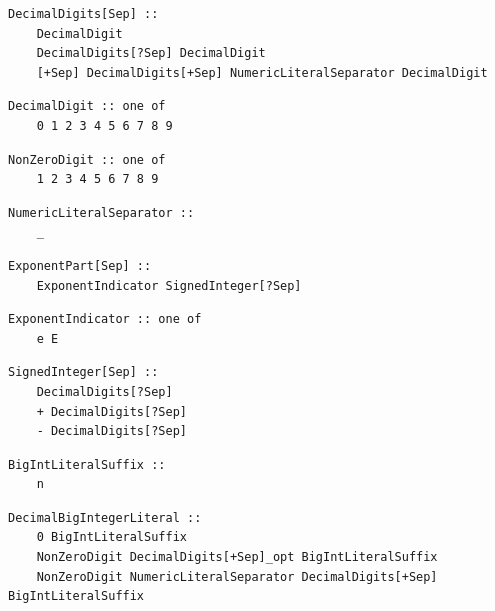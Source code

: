 \noindent\textbf{\texttt{}}\par
\begin{lstlisting}
DecimalDigits[Sep] ::
    DecimalDigit
    DecimalDigits[?Sep] DecimalDigit
    [+Sep] DecimalDigits[+Sep] NumericLiteralSeparator DecimalDigit
\end{lstlisting}

\noindent\textbf{\texttt{}}\par
\begin{lstlisting}
DecimalDigit :: one of
    0 1 2 3 4 5 6 7 8 9
\end{lstlisting}

\noindent\textbf{\texttt{}}\par
\begin{lstlisting}
NonZeroDigit :: one of
    1 2 3 4 5 6 7 8 9
\end{lstlisting}

\noindent\textbf{\texttt{}}\par
\begin{lstlisting}
NumericLiteralSeparator ::
    _
\end{lstlisting}

\noindent\textbf{\texttt{}}\par
\begin{lstlisting}
ExponentPart[Sep] ::
    ExponentIndicator SignedInteger[?Sep]
\end{lstlisting}

\noindent\textbf{\texttt{}}\par
\begin{lstlisting}
ExponentIndicator :: one of
    e E
\end{lstlisting}

\noindent\textbf{\texttt{}}\par
\begin{lstlisting}
SignedInteger[Sep] ::
    DecimalDigits[?Sep]
    + DecimalDigits[?Sep]
    - DecimalDigits[?Sep]
\end{lstlisting}

\noindent\textbf{\texttt{}}\par
\begin{lstlisting}
BigIntLiteralSuffix ::
    n
\end{lstlisting}

\noindent\textbf{\texttt{}}\par
\begin{lstlisting}
DecimalBigIntegerLiteral ::
    0 BigIntLiteralSuffix
    NonZeroDigit DecimalDigits[+Sep]_opt BigIntLiteralSuffix
    NonZeroDigit NumericLiteralSeparator DecimalDigits[+Sep] BigIntLiteralSuffix
\end{lstlisting}


